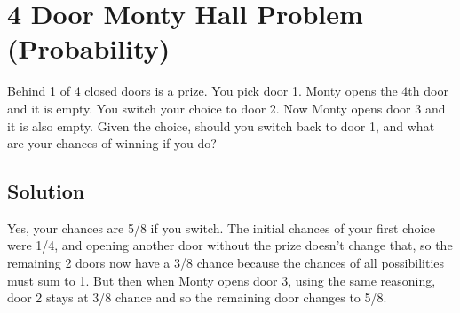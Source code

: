 \section{4 Door Monty Hall Problem (Probability)}
Behind 1 of 4 closed doors is a prize. You pick door 1. Monty opens the 4th door and it is empty. You switch your choice to door 2. Now Monty opens door 3 and it is also empty. Given the choice, should you switch back to door 1, and what are your chances of winning if you do?

\subsection{Solution}
Yes, your chances are 5/8 if you switch. The initial chances of your first choice were 1/4, and opening another door without the prize doesn't change that, so the remaining 2 doors now have a 3/8 chance because the chances of all possibilities must sum to 1. But then when Monty opens door 3, using the same reasoning, door 2 stays at 3/8 chance and so the remaining door changes to 5/8.
